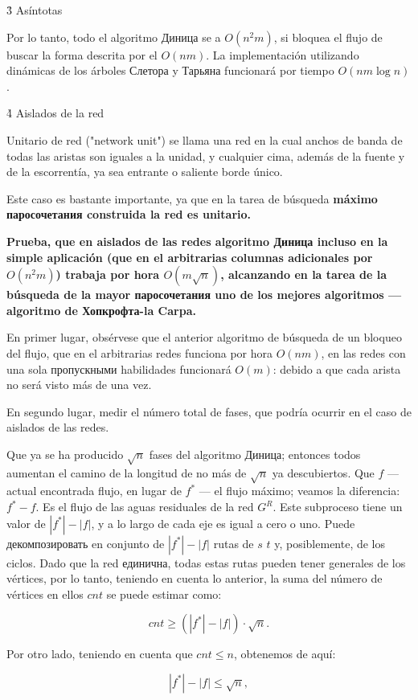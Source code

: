 \h3{ Asíntotas }

Por lo tanto, todo el algoritmo Диница se a $O (n^2 m)$, si bloquea el flujo de buscar la forma descrita por el $O (n m)$. La implementación utilizando dinámicas de los árboles Слетора y Тарьяна funcionará por tiempo $O (n m \log n)$.

\h4{ Aislados de la red }

Unitario de red ("network unit") se llama una red en la cual anchos de banda de todas las aristas son iguales a la unidad, y cualquier cima, además de la fuente y de la escorrentía, ya sea entrante o saliente borde único.

Este caso es bastante importante, ya que en la tarea de búsqueda \bf{máximo паросочетания} construida la red es unitario.

\bf{Prueba}, que en aislados de las redes algoritmo Диница incluso en la simple aplicación (que en el arbitrarias columnas adicionales por $O (n^2 m)$) trabaja por hora $O (m \sqrt{n})$, alcanzando en la tarea de la búsqueda de la mayor паросочетания uno de los mejores algoritmos --- algoritmo de Хопкрофта-la Carpa.

En primer lugar, obsérvese que el anterior algoritmo de búsqueda de un bloqueo del flujo, que en el arbitrarias redes funciona por hora $O (n m)$, en las redes con una sola пропускными habilidades funcionará $O (m)$: debido a que cada arista no será visto más de una vez.

En segundo lugar, medir el número total de fases, que podría ocurrir en el caso de aislados de las redes.

Que ya se ha producido $\sqrt{n}$ fases del algoritmo Диница; entonces todos aumentan el camino de la longitud de no más de $\sqrt{n}$ ya descubiertos. Que $f$ --- actual encontrada flujo, en lugar de $f^*$ --- el flujo máximo; veamos la diferencia: $f^* - f$. Es el flujo de las aguas residuales de la red $G^R$. Este subproceso tiene un valor de $|f^*| - |f|$, y a lo largo de cada eje es igual a cero o uno. Puede декомпозировать en conjunto de $|f^*| - |f|$ rutas de $s$ $t$ y, posiblemente, de los ciclos. Dado que la red единична, todas estas rutas pueden tener generales de los vértices, por lo tanto, teniendo en cuenta lo anterior, la suma del número de vértices en ellos $cnt$ se puede estimar como:

$$ cnt \ge (|f^*| - |f|) \cdot \sqrt{n}. $$

Por otro lado, teniendo en cuenta que $cnt \le n$, obtenemos de aquí:

$$ |f^*| - |f| \le \sqrt{n}, $$

